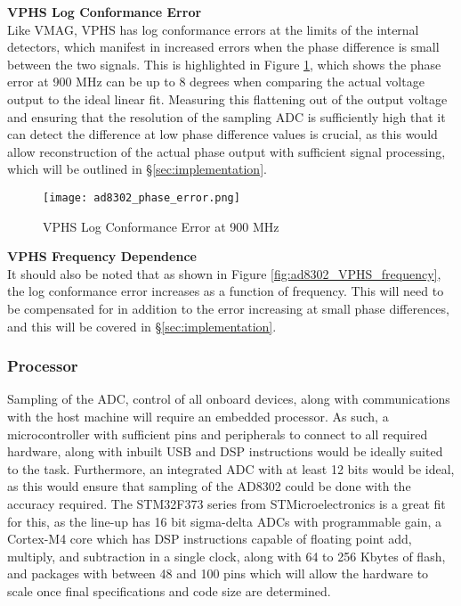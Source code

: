 \textbf{VPHS Log Conformance Error}\\
Like VMAG, VPHS has log conformance errors at the limits of the internal detectors, which manifest in increased errors when the phase difference is small between the two signals. This is highlighted in Figure \ref{fig:ad8302_VPHS_conformance}, which shows the phase error at 900 MHz can be up to 8 degrees when comparing the actual voltage output to the ideal linear fit. Measuring this flattening out of the output voltage and ensuring that the resolution of the sampling ADC is sufficiently high that it can detect the difference at low phase difference values is crucial, as this would allow reconstruction of the actual phase output with sufficient signal processing, which will be outlined in \S \ref{sec:implementation}. 
\begin{figure}[H]
	\centering
	\texttt{[image: ad8302\_phase\_error.png]}
	\caption{VPHS Log Conformance Error at 900 MHz}
	\label{fig:ad8302_VPHS_conformance}
\end{figure}

\textbf{VPHS Frequency Dependence} \\
It should also be noted that as shown in Figure \ref{fig:ad8302_VPHS_frequency}, the log conformance error increases as a function of frequency. This will need to be compensated for in addition to the error increasing at small phase differences, and this will be covered in \S \ref{sec:implementation}. 

\subsubsection{Processor}
Sampling of the ADC, control of all onboard devices, along with communications with the host machine will require an embedded processor. As such, a microcontroller with sufficient pins and peripherals to connect to all required hardware, along with inbuilt USB and DSP instructions would be ideally suited to the task. Furthermore, an integrated ADC with at least 12 bits would be ideal, as this would ensure that sampling of the AD8302 could be done with the accuracy required. The STM32F373 series from STMicroelectronics is a great fit for this, as the line-up has 16 bit sigma-delta ADCs with programmable gain, a Cortex-M4 core which has DSP instructions capable of floating point add, multiply, and subtraction in a single clock, along with 64 to 256 Kbytes of flash, and packages with between 48 and 100 pins which will allow the hardware to scale once final specifications and code size are determined. 

